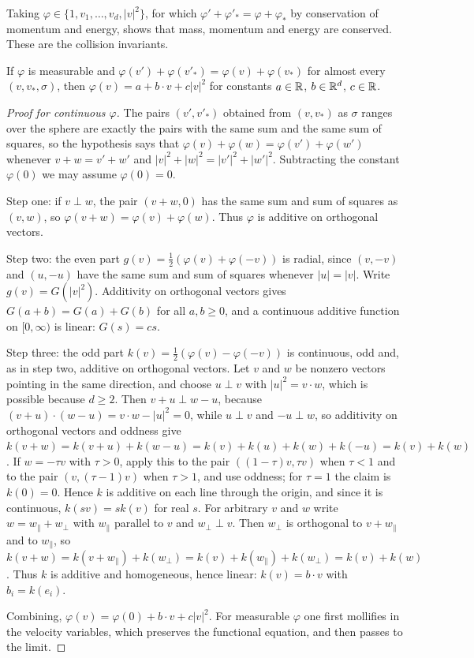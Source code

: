 Taking $\varphi\in\{1,v_1,\dots,v_d,|v|^2\}$, for which $\varphi'+\varphi'_* = \varphi+\varphi_*$ by conservation of momentum and energy, shows that mass, momentum and energy are conserved. These are the collision invariants.

\begin{lemma}
\label{lem:collision_invariants}
If $\varphi$ is measurable and $\varphi(v')+\varphi(v'_*) = \varphi(v)+\varphi(v_*)$ for almost every $(v,v_*,\sigma)$, then $\varphi(v) = a+b\cdot v+c|v|^2$ for constants $a\in\mathbb{R}$, $b\in\mathbb{R}^d$, $c\in\mathbb{R}$.
\end{lemma}

\begin{proof}[Proof for continuous $\varphi$]
The pairs $(v',v'_*)$ obtained from $(v,v_*)$ as $\sigma$ ranges over the sphere are exactly the pairs with the same sum and the same sum of squares, so the hypothesis says that $\varphi(v)+\varphi(w) = \varphi(v')+\varphi(w')$ whenever $v+w = v'+w'$ and $|v|^2+|w|^2 = |v'|^2+|w'|^2$. Subtracting the constant $\varphi(0)$ we may assume $\varphi(0) = 0$.

Step one: if $v\perp w$, the pair $(v+w,0)$ has the same sum and sum of squares as $(v,w)$, so $\varphi(v+w) = \varphi(v)+\varphi(w)$. Thus $\varphi$ is additive on orthogonal vectors.

Step two: the even part $g(v) = \frac12(\varphi(v)+\varphi(-v))$ is radial, since $(v,-v)$ and $(u,-u)$ have the same sum and sum of squares whenever $|u| = |v|$. Write $g(v) = G(|v|^2)$. Additivity on orthogonal vectors gives $G(a+b) = G(a)+G(b)$ for all $a,b\geq0$, and a continuous additive function on $[0,\infty)$ is linear: $G(s) = cs$.

Step three: the odd part $k(v) = \frac12(\varphi(v)-\varphi(-v))$ is continuous, odd and, as in step two, additive on orthogonal vectors. Let $v$ and $w$ be nonzero vectors pointing in the same direction, and choose $u\perp v$ with $|u|^2 = v\cdot w$, which is possible because $d\geq2$. Then $v+u\perp w-u$, because $(v+u)\cdot(w-u) = v\cdot w-|u|^2 = 0$, while $u\perp v$ and $-u\perp w$, so additivity on orthogonal vectors and oddness give $k(v+w) = k(v+u)+k(w-u) = k(v)+k(u)+k(w)+k(-u) = k(v)+k(w)$. If $w = -\tau v$ with $\tau>0$, apply this to the pair $((1-\tau)v,\tau v)$ when $\tau<1$ and to the pair $(v,(\tau-1)v)$ when $\tau>1$, and use oddness; for $\tau = 1$ the claim is $k(0) = 0$. Hence $k$ is additive on each line through the origin, and since it is continuous, $k(sv) = sk(v)$ for real $s$. For arbitrary $v$ and $w$ write $w = w_\parallel+w_\perp$ with $w_\parallel$ parallel to $v$ and $w_\perp\perp v$. Then $w_\perp$ is orthogonal to $v+w_\parallel$ and to $w_\parallel$, so $k(v+w) = k(v+w_\parallel)+k(w_\perp) = k(v)+k(w_\parallel)+k(w_\perp) = k(v)+k(w)$. Thus $k$ is additive and homogeneous, hence linear: $k(v) = b\cdot v$ with $b_i = k(e_i)$.

Combining, $\varphi(v) = \varphi(0)+b\cdot v+c|v|^2$. For measurable $\varphi$ one first mollifies in the velocity variables, which preserves the functional equation, and then passes to the limit.
\end{proof}

